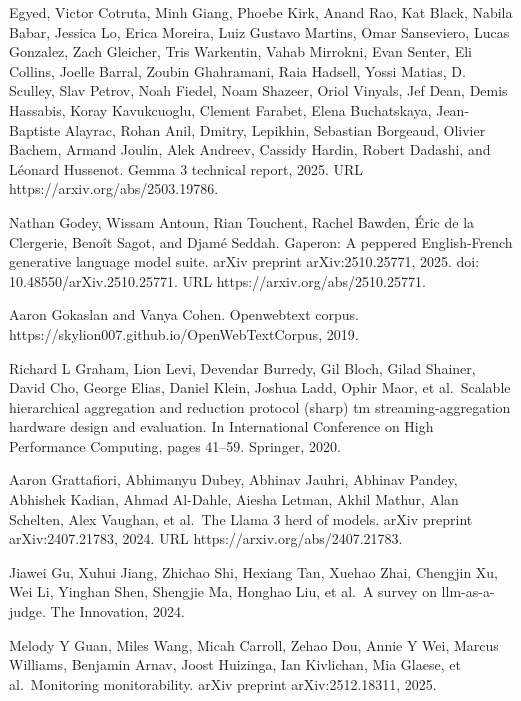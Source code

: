 \documentclass[
  10
]{article}
\begin{document}
Egyed, Victor Cotruta, Minh Giang, Phoebe Kirk, Anand Rao, Kat Black,
Nabila Babar, Jessica Lo, Erica Moreira, Luiz Gustavo Martins, Omar
Sanseviero, Lucas Gonzalez, Zach Gleicher, Tris Warkentin, Vahab
Mirrokni, Evan Senter, Eli Collins, Joelle Barral, Zoubin Ghahramani,
Raia Hadsell, Yossi Matias, D. Sculley, Slav Petrov, Noah Fiedel, Noam
Shazeer, Oriol Vinyals, Jef Dean, Demis Hassabis, Koray Kavukcuoglu,
Clement Farabet, Elena Buchatskaya, Jean-Baptiste Alayrac, Rohan Anil,
Dmitry, Lepikhin, Sebastian Borgeaud, Olivier Bachem, Armand Joulin,
Alek Andreev, Cassidy Hardin, Robert Dadashi, and Léonard Hussenot.
Gemma 3 technical report, 2025. URL https://arxiv.org/abs/2503.19786.

Nathan Godey, Wissam Antoun, Rian Touchent, Rachel Bawden, Éric de la
Clergerie, Benoît Sagot, and Djamé Seddah. Gaperon: A peppered
English-French generative language model suite. arXiv preprint
arXiv:2510.25771, 2025. doi: 10.48550/arXiv.2510.25771. URL
https://arxiv.org/abs/2510.25771.

Aaron Gokaslan and Vanya Cohen. Openwebtext corpus.
https://skylion007.github.io/OpenWebTextCorpus, 2019.

Richard L Graham, Lion Levi, Devendar Burredy, Gil Bloch, Gilad Shainer,
David Cho, George Elias, Daniel Klein, Joshua Ladd, Ophir Maor, et
al.~Scalable hierarchical aggregation and reduction protocol (sharp) tm
streaming-aggregation hardware design and evaluation. In International
Conference on High Performance Computing, pages 41--59. Springer, 2020.

Aaron Grattafiori, Abhimanyu Dubey, Abhinav Jauhri, Abhinav Pandey,
Abhishek Kadian, Ahmad Al-Dahle, Aiesha Letman, Akhil Mathur, Alan
Schelten, Alex Vaughan, et al.~The Llama 3 herd of models. arXiv
preprint arXiv:2407.21783, 2024. URL https://arxiv.org/abs/2407.21783.

Jiawei Gu, Xuhui Jiang, Zhichao Shi, Hexiang Tan, Xuehao Zhai, Chengjin
Xu, Wei Li, Yinghan Shen, Shengjie Ma, Honghao Liu, et al.~A survey on
llm-as-a-judge. The Innovation, 2024.

Melody Y Guan, Miles Wang, Micah Carroll, Zehao Dou, Annie Y Wei, Marcus
Williams, Benjamin Arnav, Joost Huizinga, Ian Kivlichan, Mia Glaese, et
al.~Monitoring monitorability. arXiv preprint arXiv:2512.18311, 2025.
\end{document}
